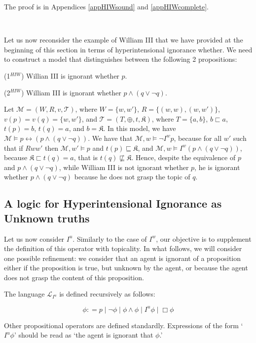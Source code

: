 \documentclass{article}
\begin{document}
The proof is in Appendices \ref{appHIWsound} and \ref{appHIWcomplete}.




\

Let us now reconsider the example of William III that we have provided at the beginning of this section in terms of hyperintensional ignorance whether. We need to construct a model that distinguishes between the following 2 propositions:

(1$^{HIW}$) Willian III is ignorant whether $p$.

(2$^{HIW}$) William III is ignorant whether $p \wedge (q \vee \neg q)$.

Let $\mathcal{M} = (W, R, v, \mathcal{T})$, where $W = \{w, w'\}$, $R = \{(w,w), (w,w')\}$, $v(p) = v(q) = \{w, w'\}$, and $\mathcal{T} = (T, \oplus, t, \mathfrak{K})$, where $T =\{a, b\}$, $b \sqsubset a$, $t(p) = b$, $t(q) = a$, and $b = \mathfrak{K}$. In this model, we have $\mathcal{M} \models p \leftrightarrow (p \wedge (q \vee \neg q))$. We have that $\mathcal{M}, w \models \neg I^{w} p$, because for all $w'$ such that if $Rww'$ then $\mathcal{M}, w' \models p$ and $t(p) \sqsubseteq \mathfrak{K}$, and $\mathcal{M}, w \models I^{w} (p \wedge (q \vee \neg q))$, because $\mathfrak{K} \sqsubset t(q) = a$, that is $t(q) \not \sqsubseteq \mathfrak{K}$. Hence, despite the equivalence of $p$ and $p \wedge (q \vee \neg q)$, while William III is not ignorant whether $p$, he is ignorant whether $p \wedge (q \vee \neg q)$ because he does not grasp the topic of $q$.




\subsection{A logic for Hyperintensional Ignorance as Unknown truths}

Let us now consider $I^{u}$. Similarly to the case of $I^{w}$, our objective is to supplement the definition of this operator with topicality. In what follows, we will consider one possible refinement: we consider that an agent is ignorant of a proposition either if the proposition is true, but unknown by the agent, or because the agent does not grasp the content of this proposition. 

The language $\mathcal{L}_{I^{u}}$ is defined recursively as follows:

$$ \phi : = p \mid \neg \phi \mid \phi \wedge \phi \mid I^{u} \phi \mid \Box \phi$$

Other propositional operators are defined standardly. Expressions of the form `$I^{u}\phi$' should be read as `the agent is ignorant that $\phi$.'
\end{document}
